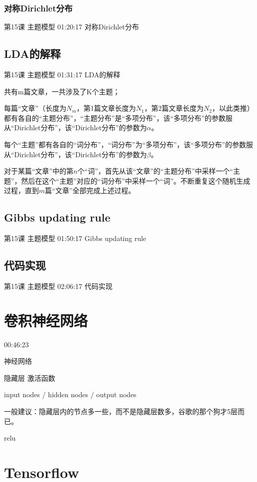 \documentclass[UTF8]{ctexart}
\begin{document}
\subsubsection{对称Dirichlet分布}

第15课 主题模型 01:20:17 对称Dirichlet分布

\subsection{LDA的解释}

第15课 主题模型 01:31:17 LDA的解释

共有m篇文章，一共涉及了K个主题；

每篇“文章”（长度为$N_{m}$，第1篇文章长度为$N_{1}$，第2篇文章长度为$N_{2}$，以此类推）都有各自的“主题分布”，“主题分布”是“多项分布”，该“多项分布”的参数服从“Dirichlet分布”，该“Dirichlet分布”的参数为$\alpha$。

每个“主题”都有各自的“词分布”，“词分布”为“多项分布”，该“多项分布”的参数服从“Dirichlet分布”，该“Dirichlet分布”的参数为$\beta$。

对于某篇“文章”中的第$n$个“词”，首先从该“文章”的“主题分布”中采样一个“主题”，然后在这个“主题”对应的“词分布”中采样一个“词”。不断重复这个随机生成过程，直到$m$篇“文章”全部完成上述过程。

\subsection{Gibbs updating rule}

第15课 主题模型 01:50:17 Gibbs updating rule

\subsection{代码实现}

第15课 主题模型 02:06:17 代码实现

\section{卷积神经网络}

00:46:23

神经网络

隐藏层 激活函数

input nodes / hidden nodes / output nodes

一般建议：隐藏层内的节点多一些，而不是隐藏层数多，谷歌的那个狗才5层而已。

relu

\section{Tensorflow}
\end{document}
